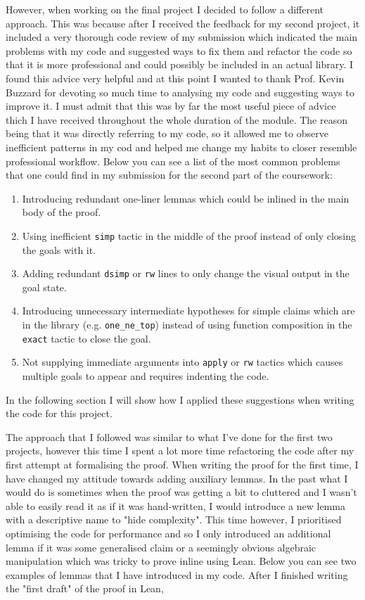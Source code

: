 \documentclass[11pt]{article}
\begin{document}
However, when working on the final project I decided to follow a different approach.
This was because after I received the feedback for my second project, it included
a very thorough code review of my submission which indicated the main problems
with my code and suggested ways to fix them and refactor the code so that it is
more professional and could possibly be included in an actual library. I found
this advice very helpful and at this point I wanted to thank Prof. Kevin Buzzard
for devoting so much time to analysing my code and suggesting ways to improve it.
I must admit that this was by far the most useful piece of advice thich I have
received throughout the whole duration of the module. The reason being that it
was directly referring to my code, so it allowed me to observe inefficient patterns
in my cod  and helped me change my habits to closer resemble professional workflow.
Below you can see a list of the most common problems that one could find in my
submission for the second part of the coursework:
\begin{enumerate}
  \item Introducing redundant one-liner lemmas which could be inlined in the main
    body of the proof.
  \item Using inefficient \texttt{simp} tactic in the middle of the proof instead of only closing the goals with it.
  \item Adding redundant \texttt{dsimp} or \texttt{rw} lines to only change the visual output in the goal state.
  \item Introducing unnecessary intermediate hypotheses for simple claims which
    are in the library (e.g. \texttt{one\_ne\_top}) instead of using function composition
    in the \texttt{exact} tactic to close the goal.
  \item Not supplying immediate arguments into \texttt{apply} or \texttt{rw} tactics
    which causes multiple goals to appear and requires indenting the code.
\end{enumerate}
In the following section I will show how I applied these suggestions when writing
the code for this project.

The approach that I followed was similar to what I've done for the first two
projects, however this time I spent a lot more time refactoring the code after my
first attempt at formalising the proof. When writing the proof for the first time,
I have changed my attitude towards adding auxiliary lemmas. In the past what I
would do is sometimes when the proof was getting a bit to cluttered and I wasn't
able to easily read it as if it was hand-written, I would introduce a new lemma
with a descriptive name to "hide complexity". This time however, I prioritised
optimising the code for performance and so I only introduced an additional lemma
if it was some generalised claim or a seemingly obvious algebraic manipulation which
was tricky to prove inline using Lean. Below you can see two examples of lemmas that
I have introduced in my code.
After I finished writing the "first draft"
of the proof in Lean,
\end{document}
